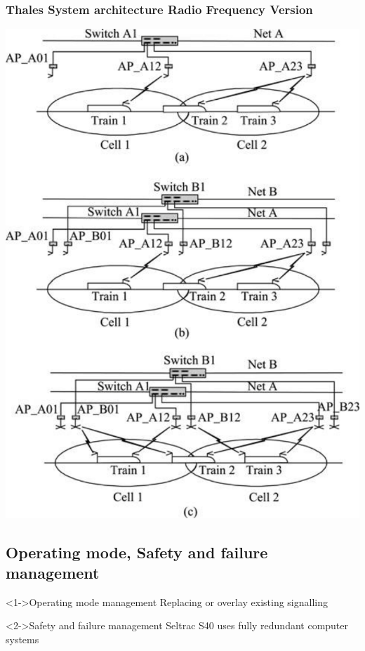 \frame
{
  \frametitle{Thales System architecture Radio Frequency Version}
 \begin{center}
	\includegraphics[scale=0.45]{./fig/SeltracRFArchitetture}
      \end{center}
      
   
}

\subsection{Operating mode, Safety and failure management}
\frame
{
\begin{block}<1->{Operating mode management}
Replacing or overlay existing signalling
\end{block}
\begin{alertblock}<2->{Safety and failure management}
Seltrac S40 uses fully redundant computer systems 

   \end{alertblock}
}


